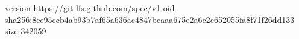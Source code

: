 version https://git-lfs.github.com/spec/v1
oid sha256:8ee95ccb4ab93b7af65a636ac4847bcaaa675e2a6c2c652055fa8f71f26dd133
size 342059
